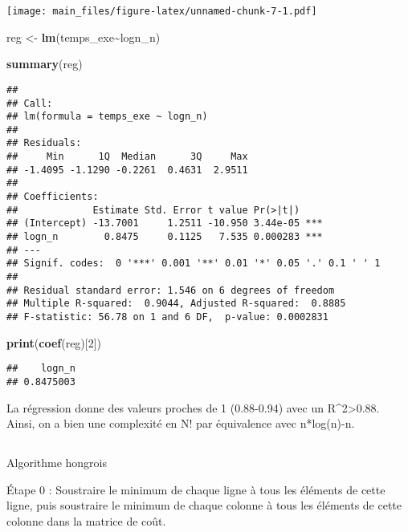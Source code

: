 \documentclass[
]{article}
\newenvironment{Shaded}{\begin{snugshade}}{\end{snugshade}}
\newcommand{\DecValTok}[1]{\textcolor[rgb]{0.00,0.00,0.81}{#1}}
\newcommand{\FunctionTok}[1]{\textcolor[rgb]{0.13,0.29,0.53}{\textbf{#1}}}
\newcommand{\NormalTok}[1]{#1}
\newcommand{\OtherTok}[1]{\textcolor[rgb]{0.56,0.35,0.01}{#1}}
\newcommand{\SpecialCharTok}[1]{\textcolor[rgb]{0.81,0.36,0.00}{\textbf{#1}}}
\begin{document}
\texttt{[image: main\_files/figure-latex/unnamed-chunk-7-1.pdf]}

\begin{Shaded}
\begin{Highlighting}[]
\NormalTok{reg }\OtherTok{\textless{}{-}} \FunctionTok{lm}\NormalTok{(temps\_exe}\SpecialCharTok{\textasciitilde{}}\NormalTok{logn\_n)}

\FunctionTok{summary}\NormalTok{(reg)}
\end{Highlighting}
\end{Shaded}

\begin{verbatim}
## 
## Call:
## lm(formula = temps_exe ~ logn_n)
## 
## Residuals:
##     Min      1Q  Median      3Q     Max 
## -1.4095 -1.1290 -0.2261  0.4631  2.9511 
## 
## Coefficients:
##             Estimate Std. Error t value Pr(>|t|)    
## (Intercept) -13.7001     1.2511 -10.950 3.44e-05 ***
## logn_n        0.8475     0.1125   7.535 0.000283 ***
## ---
## Signif. codes:  0 '***' 0.001 '**' 0.01 '*' 0.05 '.' 0.1 ' ' 1
## 
## Residual standard error: 1.546 on 6 degrees of freedom
## Multiple R-squared:  0.9044, Adjusted R-squared:  0.8885 
## F-statistic: 56.78 on 1 and 6 DF,  p-value: 0.0002831
\end{verbatim}

\begin{Shaded}
\begin{Highlighting}[]
\FunctionTok{print}\NormalTok{(}\FunctionTok{coef}\NormalTok{(reg)[}\DecValTok{2}\NormalTok{])}
\end{Highlighting}
\end{Shaded}

\begin{verbatim}
##    logn_n 
## 0.8475003
\end{verbatim}

La régression donne des valeurs proches de 1 (0.88-0.94) avec un
R\^{}2\textgreater0.88. Ainsi, on a bien une complexité en N! par
équivalence avec n*log(n)-n.~

\hypertarget{section-13}{%
\subsection{}\label{section-13}}

Algorithme hongrois

Étape 0 : Soustraire le minimum de chaque ligne à tous les éléments de
cette ligne, puis soustraire le minimum de chaque colonne à tous les
éléments de cette colonne dans la matrice de coût.
\end{document}

